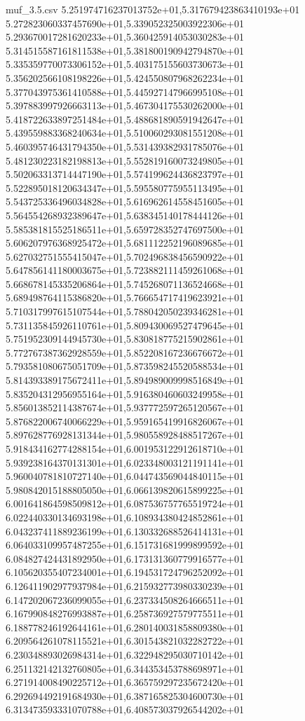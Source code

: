 \begin{filecontents*}{muf_3.5.csv}
5.251974716237013752e+01,5.317679423863410193e+01
5.272823060337457690e+01,5.339052325003922306e+01
5.293670017281620233e+01,5.360425914053030283e+01
5.314515587161811538e+01,5.381800190942794870e+01
5.335359770073306152e+01,5.403175155603730673e+01
5.356202566108198226e+01,5.424550807968262234e+01
5.377043975361410588e+01,5.445927147966995108e+01
5.397883997926663113e+01,5.467304175530262000e+01
5.418722633897251484e+01,5.488681890591942647e+01
5.439559883368240634e+01,5.510060293081551208e+01
5.460395746431794350e+01,5.531439382931785076e+01
5.481230223182198813e+01,5.552819160073249805e+01
5.502063313714447190e+01,5.574199624436823797e+01
5.522895018120634347e+01,5.595580775955113495e+01
5.543725336496034828e+01,5.616962614558451605e+01
5.564554268932389647e+01,5.638345140178444126e+01
5.585381815525186511e+01,5.659728352747697500e+01
5.606207976368925472e+01,5.681112252196089685e+01
5.627032751555415047e+01,5.702496838456590922e+01
5.647856141180003675e+01,5.723882111459261068e+01
5.668678145335206864e+01,5.745268071136524668e+01
5.689498764115386820e+01,5.766654717419623921e+01
5.710317997615107544e+01,5.788042050239346281e+01
5.731135845926110761e+01,5.809430069527479645e+01
5.751952309144945730e+01,5.830818775215902861e+01
5.772767387362928559e+01,5.852208167236676672e+01
5.793581080675051709e+01,5.873598245520588534e+01
5.814393389175672411e+01,5.894989009998516849e+01
5.835204312956955164e+01,5.916380460603249958e+01
5.856013852114387674e+01,5.937772597265120567e+01
5.876822006740066229e+01,5.959165419916826067e+01
5.897628776928131344e+01,5.980558928488517267e+01
5.918434162774288154e+01,6.001953122912618710e+01
5.939238164370131301e+01,6.023348003121191141e+01
5.960040781810727140e+01,6.044743569044840115e+01
5.980842015188805050e+01,6.066139820615899225e+01
6.001641864598509812e+01,6.087536757765519724e+01
6.022440330134693198e+01,6.108934380424852861e+01
6.043237411889236199e+01,6.130332688526414131e+01
6.064033109957487255e+01,6.151731681999899592e+01
6.084827424431892950e+01,6.173131360779916577e+01
6.105620355407234001e+01,6.194531724796252092e+01
6.126411902977937984e+01,6.215932773980330239e+01
6.147202067236099055e+01,6.237334508264666511e+01
6.167990848276993887e+01,6.258736927579775511e+01
6.188778246192644161e+01,6.280140031858809380e+01
6.209564261078115521e+01,6.301543821032282722e+01
6.230348893026984314e+01,6.322948295030710142e+01
6.251132142132760805e+01,6.344353453788698971e+01
6.271914008490225712e+01,6.365759297235672420e+01
6.292694492191684930e+01,6.387165825304600730e+01
6.313473593331070788e+01,6.408573037926544202e+01

\end{filecontents*}
